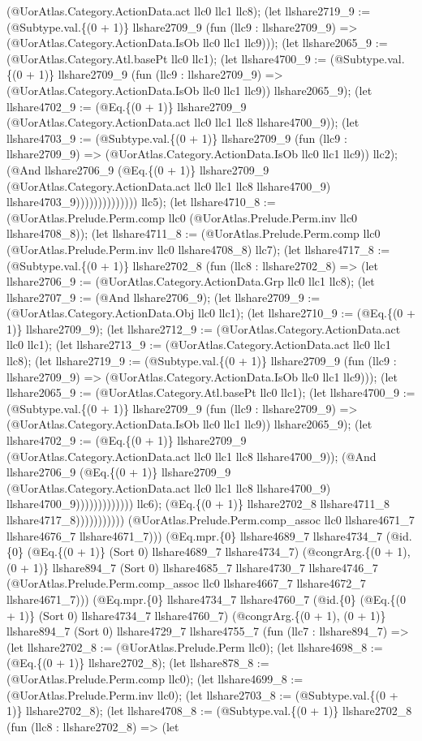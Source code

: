 \documentclass[11pt]{article}
\begin{document}
(@UorAtlas.Category.ActionData.act llc0 llc1 llc8); (let llshare2719\_9 := (@Subtype.val.\{(0 + 1)\} llshare2709\_9 (fun (llc9 : llshare2709\_9) => (@UorAtlas.Category.ActionData.IsOb llc0 llc1 llc9))); (let llshare2065\_9 := (@UorAtlas.Category.Atl.basePt llc0 llc1); (let llshare4700\_9 := (@Subtype.val.\{(0 + 1)\} llshare2709\_9 (fun (llc9 : llshare2709\_9) => (@UorAtlas.Category.ActionData.IsOb llc0 llc1 llc9)) llshare2065\_9); (let llshare4702\_9 := (@Eq.\{(0 + 1)\} llshare2709\_9 (@UorAtlas.Category.ActionData.act llc0 llc1 llc8 llshare4700\_9)); (let llshare4703\_9 := (@Subtype.val.\{(0 + 1)\} llshare2709\_9 (fun (llc9 : llshare2709\_9) => (@UorAtlas.Category.ActionData.IsOb llc0 llc1 llc9)) llc2); (@And llshare2706\_9 (@Eq.\{(0 + 1)\} llshare2709\_9 (@UorAtlas.Category.ActionData.act llc0 llc1 llc8 llshare4700\_9) llshare4703\_9)))))))))))))) llc5); (let llshare4710\_8 := (@UorAtlas.Prelude.Perm.comp llc0 (@UorAtlas.Prelude.Perm.inv llc0 llshare4708\_8)); (let llshare4711\_8 := (@UorAtlas.Prelude.Perm.comp llc0 (@UorAtlas.Prelude.Perm.inv llc0 llshare4708\_8) llc7); (let llshare4717\_8 := (@Subtype.val.\{(0 + 1)\} llshare2702\_8 (fun (llc8 : llshare2702\_8) => (let llshare2706\_9 := (@UorAtlas.Category.ActionData.Grp llc0 llc1 llc8); (let llshare2707\_9 := (@And llshare2706\_9); (let llshare2709\_9 := (@UorAtlas.Category.ActionData.Obj llc0 llc1); (let llshare2710\_9 := (@Eq.\{(0 + 1)\} llshare2709\_9); (let llshare2712\_9 := (@UorAtlas.Category.ActionData.act llc0 llc1); (let llshare2713\_9 := (@UorAtlas.Category.ActionData.act llc0 llc1 llc8); (let llshare2719\_9 := (@Subtype.val.\{(0 + 1)\} llshare2709\_9 (fun (llc9 : llshare2709\_9) => (@UorAtlas.Category.ActionData.IsOb llc0 llc1 llc9))); (let llshare2065\_9 := (@UorAtlas.Category.Atl.basePt llc0 llc1); (let llshare4700\_9 := (@Subtype.val.\{(0 + 1)\} llshare2709\_9 (fun (llc9 : llshare2709\_9) => (@UorAtlas.Category.ActionData.IsOb llc0 llc1 llc9)) llshare2065\_9); (let llshare4702\_9 := (@Eq.\{(0 + 1)\} llshare2709\_9 (@UorAtlas.Category.ActionData.act llc0 llc1 llc8 llshare4700\_9)); (@And llshare2706\_9 (@Eq.\{(0 + 1)\} llshare2709\_9 (@UorAtlas.Category.ActionData.act llc0 llc1 llc8 llshare4700\_9) llshare4700\_9))))))))))))) llc6); (@Eq.\{(0 + 1)\} llshare2702\_8 llshare4711\_8 llshare4717\_8))))))))))) (@UorAtlas.Prelude.Perm.comp\_assoc llc0 llshare4671\_7 llshare4676\_7 llshare4671\_7))) (@Eq.mpr.\{0\} llshare4689\_7 llshare4734\_7 (@id.\{0\} (@Eq.\{(0 + 1)\} (Sort 0) llshare4689\_7 llshare4734\_7) (@congrArg.\{(0 + 1), (0 + 1)\} llshare894\_7 (Sort 0) llshare4685\_7 llshare4730\_7 llshare4746\_7 (@UorAtlas.Prelude.Perm.comp\_assoc llc0 llshare4667\_7 llshare4672\_7 llshare4671\_7))) (@Eq.mpr.\{0\} llshare4734\_7 llshare4760\_7 (@id.\{0\} (@Eq.\{(0 + 1)\} (Sort 0) llshare4734\_7 llshare4760\_7) (@congrArg.\{(0 + 1), (0 + 1)\} llshare894\_7 (Sort 0) llshare4729\_7 llshare4755\_7 (fun (llc7 : llshare894\_7) => (let llshare2702\_8 := (@UorAtlas.Prelude.Perm llc0); (let llshare4698\_8 := (@Eq.\{(0 + 1)\} llshare2702\_8); (let llshare878\_8 := (@UorAtlas.Prelude.Perm.comp llc0); (let llshare4699\_8 := (@UorAtlas.Prelude.Perm.inv llc0); (let llshare2703\_8 := (@Subtype.val.\{(0 + 1)\} llshare2702\_8); (let llshare4708\_8 := (@Subtype.val.\{(0 + 1)\} llshare2702\_8 (fun (llc8 : llshare2702\_8) => (let 
\end{document}
